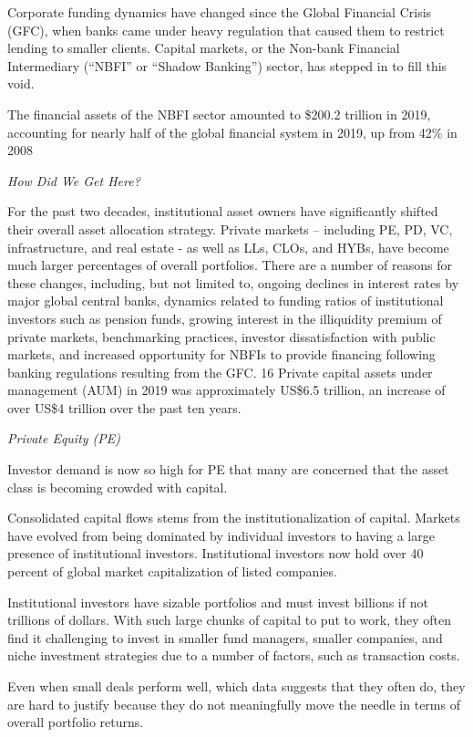 \documentclass[
]{book}
\begin{document}
Corporate funding dynamics have changed since the Global Financial Crisis
(GFC), when banks came under heavy regulation that caused them to
restrict lending to smaller clients.
Capital markets, or the Non-bank Financial Intermediary
(``NBFI'' or ``Shadow Banking'') sector, has stepped in to fill this void.

The financial assets of the NBFI sector amounted to \$200.2 trillion in 2019,
accounting for nearly half of the global financial system in 2019, up from 42\%
in 2008

\emph{How Did We Get Here?}

For the past two decades, institutional asset owners have significantly shifted their overall asset
allocation strategy. Private markets -- including PE, PD, VC, infrastructure, and real estate - as well as LLs,
CLOs, and HYBs, have become much larger percentages of overall portfolios. There are a number of
reasons for these changes, including, but not limited to, ongoing declines in interest rates by major
global central banks, dynamics related to funding ratios of institutional investors such as pension funds,
growing interest in the illiquidity premium of private markets, benchmarking practices, investor
dissatisfaction with public markets, and increased opportunity for NBFIs to provide financing following
banking regulations resulting from the GFC. 16 Private capital assets under management (AUM) in 2019
was approximately US\$6.5 trillion, an increase of over US\$4 trillion over the past ten years.

\emph{Private Equity (PE)}

Investor demand is now so high for PE that many are concerned that the asset class is becoming crowded with capital.

Consolidated capital flows stems from the institutionalization of capital.
Markets have evolved from being dominated by individual investors to
having a large presence of institutional investors.
Institutional investors now hold over 40 percent of
global market capitalization of listed companies.

Institutional investors have sizable portfolios and must invest billions
if not trillions of dollars.
With such large chunks of capital to put to work,
they often find it challenging to invest in smaller fund managers,
smaller companies, and niche investment strategies due to a number of factors,
such as transaction costs.

Even when small deals perform well, which data suggests that they often do,
they are hard to justify because they do not meaningfully move the needle
in terms of overall portfolio returns.
\end{document}
